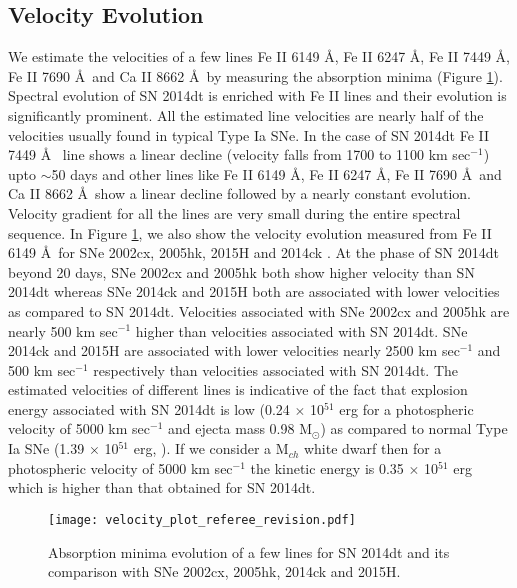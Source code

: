 \documentclass[fleqn,usenatbib]{mnras}
\begin{document}
\subsection{Velocity Evolution}

We estimate the velocities of a few lines Fe II 6149 \AA, Fe II 6247 \AA, Fe II 7449 \AA, Fe II 7690 \AA~and Ca II 8662 \AA~by measuring the absorption minima (Figure \ref{fig:velocity_plot}). Spectral evolution of SN 2014dt is enriched with Fe II lines and their evolution is significantly prominent. All the estimated line velocities are nearly half of the velocities usually found in typical Type Ia SNe. In the case of SN 2014dt Fe II 7449 \AA~ line shows a linear decline (velocity falls from 1700 to 1100 km sec$^{-1}$) upto $\sim$50 days and other lines like Fe II 6149 \AA, Fe II 6247 \AA, Fe II 7690 \AA~and Ca II 8662 \AA~show a linear decline  followed by a nearly constant evolution. Velocity gradient for all the lines are very small during the entire spectral sequence. In Figure \ref{fig:velocity_plot}, we also show the velocity evolution measured from Fe II 6149 \AA~for SNe 2002cx, 2005hk, 2015H \citep{2016A&A...589A..89M} and 2014ck \citep{2016MNRAS.459.1018T}. At the phase of SN 2014dt beyond 20 days, SNe 2002cx and 2005hk both show higher velocity than SN 2014dt whereas SNe 2014ck and 2015H both are associated with lower velocities as compared to SN 2014dt. Velocities associated with SNe 2002cx and 2005hk are nearly 500 km sec$^{-1}$ higher than velocities associated with SN 2014dt. SNe 2014ck and 2015H are associated with lower velocities nearly 2500 km sec$^{-1}$ and 500 km sec$^{-1}$ respectively than velocities associated with SN 2014dt. The estimated velocities of different lines is indicative of the fact that explosion energy associated with SN 2014dt is low (0.24 $\times$ 10$^{51}$ erg for a photospheric velocity of 5000 km sec$^{-1}$ and ejecta mass 0.98 M$_{\odot}$) as compared to normal Type Ia SNe (1.39 $\times$ 10$^{51}$ erg, \cite{2016ApJ...832...13W}). If we consider a M$_{ch}$ white dwarf then for a photospheric velocity of 5000 km sec$^{-1}$ the kinetic energy is 0.35 $\times$ 10$^{51}$ erg which is higher than that obtained for SN 2014dt.

\begin{figure}
	\begin{center}
		\texttt{[image: velocity\_plot\_referee\_revision.pdf]}
	\end{center}
	\caption{Absorption minima evolution of a few lines for SN 2014dt and its comparison with SNe 2002cx, 2005hk, 2014ck and 2015H.}
	\label{fig:velocity_plot}
\end{figure}
\end{document}
